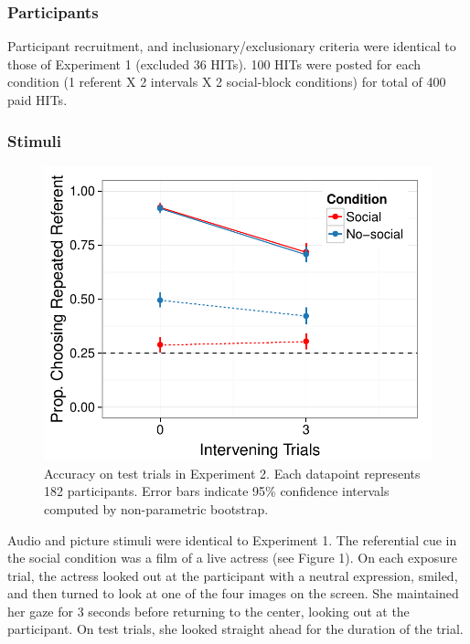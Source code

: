 \documentclass[10pt,letterpaper]{article}
\begin{document}
\subsubsection{Participants}

Participant recruitment, and inclusionary/exclusionary criteria were identical to those of Experiment 1 (excluded 36 HITs). 100 HITs were posted for each condition (1 referent X 2 intervals X 2 social-block conditions) for total of 400 paid HITs.  

\subsubsection{Stimuli}

\begin{figure}[t!]
\begin{center}
\includegraphics[scale=0.45]{plots_figs/acc-test-expt2}
\end{center}
\caption{Accuracy on test trials in Experiment 2. Each datapoint represents 182 participants. Error bars indicate 95\% confidence intervals computed by non-parametric bootstrap.}
\end{figure}

Audio and picture stimuli were identical to Experiment 1. The referential cue in the social condition was a film of a live actress (see Figure 1). On each exposure trial, the actress looked out at the participant with a neutral expression, smiled, and then turned to look at one of the four images on the screen. She maintained her gaze for 3 seconds before returning to the center, looking out at the participant. On test trials, she looked straight ahead for the duration of the trial. 
\end{document}
